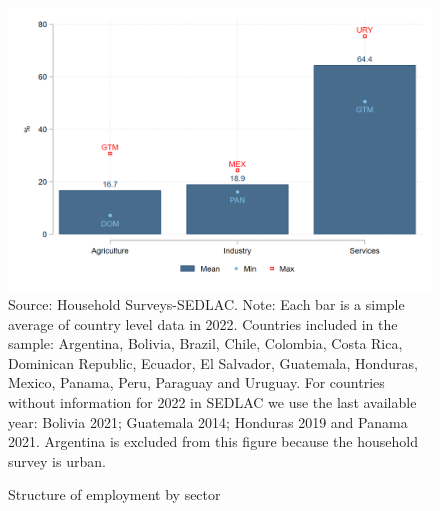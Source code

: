 \documentclass[english]{article}
\begin{document}
\begin{itemize}
\begin{figure}[!htb]
        \justifying
        \caption{Structure of employment by sector}     
        \includegraphics[scale=.3]{latex/figures/Snapshot/Structure of employment and sector.png}
        \label{fig:sector}
       \footnotesize{Source: Household Surveys-SEDLAC.}
        \footnotesize{Note: Each bar is a simple average of country level data in 2022. Countries included in the sample: Argentina, Bolivia, Brazil, Chile, Colombia, Costa Rica, Dominican Republic, Ecuador, El Salvador, Guatemala, Honduras, Mexico, Panama, Peru, Paraguay and Uruguay. For countries without information for 2022 in SEDLAC we use the last available year: Bolivia 2021; Guatemala 2014; Honduras 2019 and Panama 2021. Argentina is excluded from this figure because the household survey is urban.}
\end{figure}


\end{itemize}
\end{document}
